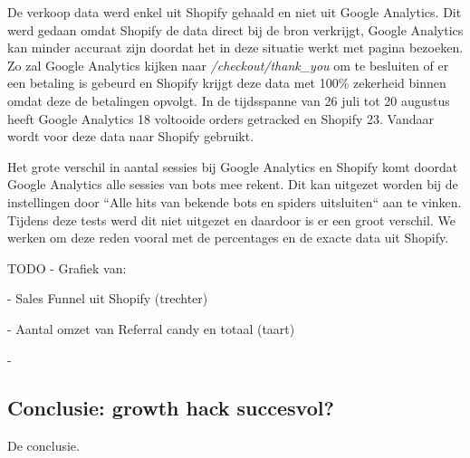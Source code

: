 De verkoop data werd enkel uit Shopify gehaald en niet uit Google Analytics. Dit werd gedaan omdat Shopify de data direct bij de bron verkrijgt, Google Analytics kan minder accuraat zijn doordat het in deze situatie werkt met pagina bezoeken. Zo zal Google Analytics kijken naar \emph{/checkout/thank\_you} om te besluiten of er een betaling is gebeurd en Shopify krijgt deze data met 100\% zekerheid binnen omdat deze de betalingen opvolgt. In de tijdsspanne van 26 juli tot 20 augustus heeft Google Analytics 18 voltooide orders getracked en Shopify 23. Vandaar wordt voor deze data naar Shopify gebruikt.

Het grote verschil in aantal sessies bij Google Analytics en Shopify komt doordat Google Analytics alle sessies van bots mee rekent. Dit kan uitgezet worden bij de instellingen door ``Alle hits van bekende bots en spiders uitsluiten`` aan te vinken. Tijdens deze tests werd dit niet uitgezet en daardoor is er een groot verschil. We werken om deze reden vooral met de percentages en de exacte data uit Shopify.

TODO - Grafiek van: 

- Sales Funnel uit Shopify (trechter)

- Aantal omzet van Referral candy en totaal (taart)

- 

\subsection{Conclusie: growth hack succesvol?} \label{sec:conclusie-growth-hack-succesvol}
De conclusie.
